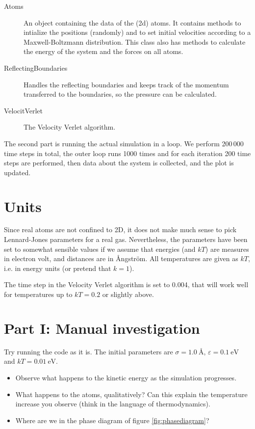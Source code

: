\documentclass[a4paper,11pt]{article}
\begin{document}
\begin{description}
\item[Atoms] An object containing the data of the (2d) atoms.  It
  contains methods to intialize the positions (randomly) and to set
  initial velocities according to a Maxwell-Boltzmann distribution.
  This class also has methods to calculate the energy of the system
  and the forces on all atoms.
\item[ReflectingBoundaries] Handles the reflecting boundaries and
  keeps track of the momentum transferred to the boundaries, so the
  pressure can be calculated.
\item[VelocitVerlet] The Velocity Verlet algorithm.
\end{description}

The second part is running the actual simulation in a loop.  We
perform 200\,000 time steps in total, the outer loop runs 1000 times
and for each iteration 200 time steps are performed, then data about
the system is collected, and the plot is updated. 

\section{Units}

Since real atoms are not confined to 2D, it does not make much sense
to pick Lennard-Jones parameters for a real gas.  Nevertheless, the
parameters have been set to somewhat sensible values if we assume that
energies (and $kT$) are measures in electron volt, and distances are
in Ångström.  All temperatures are given as $kT$, i.e. in energy units
(or pretend that $k=1$).

The time step in the Velocity Verlet algorithm is set to 0.004, that
will work well for temperatures up to $kT = 0.2$ or slightly above.

\section{Part I: Manual investigation}

Try running the code as it is.  The initial parameters are $\sigma =
\SI{1.0}{\angstrom}$, $\varepsilon = \SI{0.1}{\electronvolt}$ and $kT
= \SI{0.01}{\electronvolt}$.

\begin{itemize}
\item Observe what happens to the kinetic energy as the simulation
  progresses.
\item What happens to the atoms, qualitatively?  Can this explain the
  temperature increase you observe (think in the language of
  thermodynamics).
\item Where are we in the phase diagram of figure \ref{fig:phasediagram}?
\end{itemize}
\end{document}

